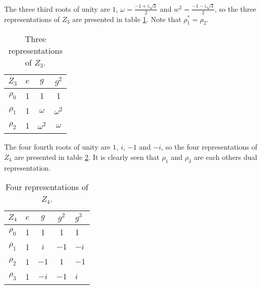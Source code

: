 		\begin{example}
			The three third roots of unity are $1$, $\omega = \frac{-1+i\sqrt{3}}{2}$ and $w^2 = \frac{-1-i\sqrt{3}}{2}$, so the three representations of $Z_3$ are presented in table \ref{table:Z3}. Note that $\rho_1^* = \rho_2$.
			
			\begin{table}[hbt!]
				\label{table:Z3}
				\begin{tabular}{c | c c c}
					$Z_3$ & $e$ & $g$        & $g^2$      \\ \hline
					$\rho_0$          & 1   & 1          & 1          \\
					$\rho_1$          & 1   & $\omega$   & $\omega^2$ \\
					$\rho_2$          & 1   & $\omega^2$ & $\omega$
				\end{tabular}
				\centering
				\caption{Three representations of $Z_3$.}
			\end{table}
		\end{example}
		
		\begin{example}
			The four fourth roots of unity are $1$, $i$, $-1$ and $-i$, so the four representations of $Z_4$ are presented in table \ref{table:Z4}. It is clearly seen that $\rho_1$ and $\rho_3$ are each others dual representation.  
			
			\begin{table}[hbt!]
				\begin{tabular}{c | c c cl}
					\label{table:Z4}
					$Z_4$ & $e$ & $g$  & $g^2$ & $g^3$ \\ \hline
					         $\rho_0$           & 1   & 1    & 1     & 1     \\
					         $\rho_1$           & 1   & $i$  & $-1$  & $-i$  \\
					         $\rho_2$           & 1   & $-1$ & $1$  & $-1$   \\
					         $\rho_3$           & 1   & $-i$ & $-1$   & $i$
				\end{tabular}
				\centering
				\caption{Four representations of $Z_4$.}
			\end{table}
		\end{example}
		
